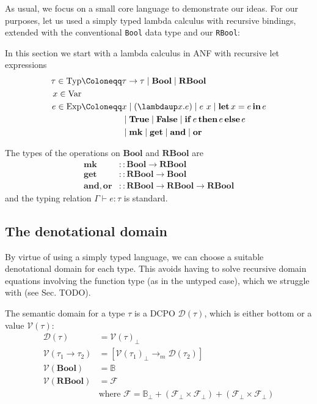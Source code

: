 \documentclass[manuscript,screen,acmsmall,nonacm]{acmart}
\newcommand{\syntax}[1]{\mathbf{#1}}
\newcommand{\Var}{\text{Var}}
\newcommand{\Exp}{\text{Exp}}
\newcommand{\Typ}{\text{Typ}}
\newcommand{\tBool}{\syntax{Bool}}
\newcommand{\tRBool}{\syntax{RBool}}
\newcommand{\slambda}{\syntax{\lambdaup}}
\newcommand{\sLet}[3]{\syntax{let}\,#1=#2\,\syntax{in}\,#3}
\newcommand{\sTrue}{\syntax{True}}
\newcommand{\sFalse}{\syntax{False}}
\newcommand{\sIf}[3]{\syntax{if}\,#1\,\syntax{then}\,#2\,\syntax{else}\,#3}
\newcommand{\sMk}{\syntax{mk}}
\newcommand{\sGet}{\syntax{get}}
\newcommand{\sAnd}{\syntax{and}}
\newcommand{\sOr}{\syntax{or}}
\newcommand{\dBool}{\mathbb B}
\newcommand{\dRBool}{\mathcal F}
\newcommand{\tV}[1]{\mathcal V(#1)}
\newcommand{\tD}[1]{\mathcal D(#1)}
\begin{document}
As usual, we focus on a small core language to demonstrate our ideas. For our purposes, let us used a simply typed lambda calculus with recursive bindings, extended with the conventional \texttt{Bool} data type and our \texttt{RBool}:


In this section we start with a lambda calculus in ANF with recursive let expressions
\begin{align*}
\tau \in \Typ &\Coloneqq \tau \to \tau \mid \tBool \mid \tRBool \\
x \in \Var & \\
e \in \Exp &\Coloneqq x \mid (\slambda x. e) \mid e~x \mid \sLet{x}{e}{e} \\
&\phantom{\Coloneqq}\mid \sTrue \mid \sFalse \mid \sIf{e}{e}{e} \\
&\phantom{\Coloneqq}\mid \sMk \mid \sGet \mid \sAnd \mid \sOr
\end{align*}

The types of the operations on $\tBool$ and $\tRBool$ are
\begin{align*}
\sMk &:: \tBool \to \tRBool \\
\sGet &:: \tRBool \to \tBool \\
\sAnd, \sOr &:: \tRBool \to \tRBool \to \tRBool
\end{align*}
and the typing relation $\Gamma \vdash e \colon \tau$ is standard.

\subsection{The denotational domain}

By virtue of using a simply typed language, we can choose a suitable denotational domain for each type. This avoids having to solve recursive domain equations involving the function type (as in the untyped case), which we struggle with (see Sec. TODO).

The semantic domain for a type $\tau$ is a DCPO $\tD\tau$, which is either bottom or a value $\tV\tau$:
\begin{align*}
\tD\tau &= \tV\tau_\bot \\
\tV{\tau_1 \to \tau_2} &= [\tV{\tau_1}_\bot \to_m \tD{\tau_2}] \\
\tV{\tBool} &= \dBool \\
\tV{\tRBool} &= \dRBool \\
&\text{where } \dRBool = \dBool_\bot + (\dRBool_\bot \times \dRBool_\bot) + (\dRBool_\bot \times \dRBool_\bot)
\end{align*}
\end{document}
